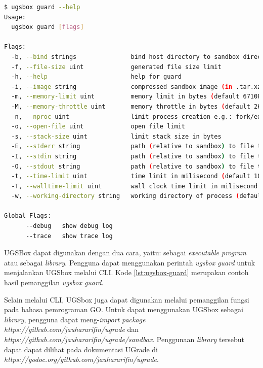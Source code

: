 \begin{lstlisting}[caption={Contoh Hasil Eksekusi Perintah \textit{ugsbox}},label={lst:ugsbox-guard},language=Bash,style=BashStyle]
$ ugsbox guard --help
Usage:
  ugsbox guard [flags]

Flags:
  -b, --bind strings               bind host directory to sandbox directory with format <hostdir>:<sandboxdir>. Warning: file owner of binded directory will be changed
  -f, --file-size uint             generated file size limit
  -h, --help                       help for guard
  -i, --image string               compressed sandbox image (in .tar.xz) path
  -m, --memory-limit uint          memory limit in bytes (default 67108864)
  -M, --memory-throttle uint       memory throttle in bytes (default 268435456)
  -n, --nproc uint                 limit process creation e.g.: fork/exec
  -o, --open-file uint             open file limit
  -s, --stack-size uint            limit stack size in bytes
  -E, --stderr string              path (relative to sandbox) to file to be used as stderr
  -I, --stdin string               path (relative to sandbox) to file to be used as stdin
  -O, --stdout string              path (relative to sandbox) to file to be used as stdout
  -t, --time-limit uint            time limit in milisecond (default 10000)
  -T, --walltime-limit uint        wall clock time limit in milisecond (default 10000)
  -w, --working-directory string   working directory of process (default "/home")

Global Flags:
      --debug   show debug log
      --trace   show trace log
\end{lstlisting}

\par UGSBox dapat digunakan dengan dua cara, yaitu: sebagai \textit{executable program} atau sebagai \textit{library}. Pengguna dapat menggunakan perintah \textit{ugsbox guard} untuk menjalankan UGSbox melalui CLI. Kode \ref{lst:ugsbox-guard} merupakan contoh hasil pemanggilan \textit{ugsbox guard}.

\par Selain melalui CLI, UGSbox juga dapat digunakan melalui pemanggilan fungsi pada bahasa pemrograman GO. Untuk dapat menggunakan UGSbox sebagai \textit{library}, pengguna dapat meng-\textit{import} \textit{package https://github.com/jauhararifin/ugrade} dan \textit{https://github.com/jauhararifin/ugrade/sandbox}. Penggunaan \textit{library} tersebut dapat dapat dilihat pada dokumentasi UGrade di \textit{https://godoc.org/github.com/jauhararifin/ugrade}.

